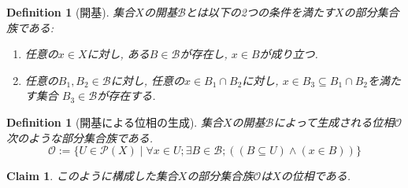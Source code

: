 \documentclass[lualatex]{ltjsbook}
\newtheorem{definition}[theorem]{Definition}
\newtheorem{claim}[theorem]{Claim}
\theoremstyle{remark}
\theoremstyle{plain}
\begin{document}
\begin{definition}[開基]
	集合$X$の開基$\mathcal{B}$とは以下の2つの条件を満たす$X$の部分集合族である:

	\begin{enumerate}
		\item 任意の$x \in X$に対し,  ある$B \in \mathcal{B}$が存在し,  $x \in B$が成り立つ.
		\item 任意の$B_1,  B_2 \in \mathcal{B}$に対し,  任意の$x \in B_1 \cap B_2$に対し,  $x \in B_3 \subseteq B_1 \cap B_2$を満たす集合 $B_3 \in \mathcal{B}$が存在する.
	\end{enumerate}

\end{definition}
\begin{definition}[開基による位相の生成]\label{1}
	集合$X$の開基$\mathcal{B}$によって生成される位相$\mathcal{O}$次のような部分集合族である.
	$$
	\mathcal{O} := \{ U \in \mathcal{P}(X) \mid \forall x \in U ; \exists B \in \mathcal{B} ; \left( \left( B  \subseteq U \right) \land \left(x \in B \right) \right) \}
	$$
\end{definition}
\begin{claim}
	このように構成した集合$X$の部分集合族$\mathcal{O}$は$X$の位相である.
\end{claim}
\end{document}
